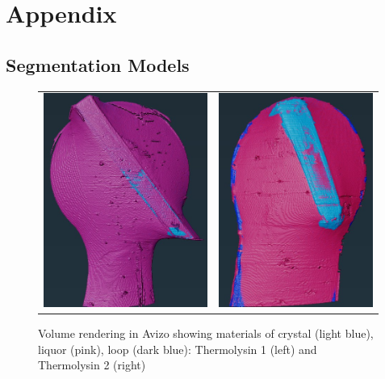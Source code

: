 \printbibliography
\newpage

\appendix
\noindent
\section{Appendix}
\subsection{Segmentation Models}

\begin{figure}[h]
    \begin{tabular}{cc}
    	\includegraphics[height=7cm ]{images/avizo_flats/tlys9.jpg} & \includegraphics[height=7cm]{images/avizo_flats/tlys2.jpg}
    \end{tabular}
	\caption{Volume rendering in Avizo showing materials of crystal (light blue), liquor (pink), loop (dark blue): Thermolysin 1 (left) and Thermolysin 2 (right)}
 \label{tlys2}
\end{figure}


